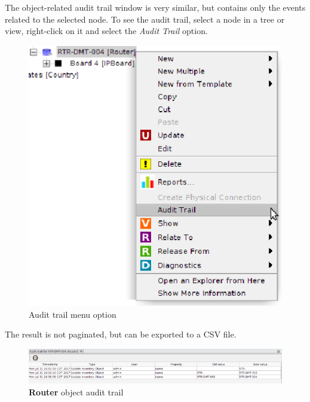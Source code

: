 \documentclass[a4paper]{article}
\begin{document}
	The object-related audit trail window is very similar, but contains only the events related to the selected node. To see the audit trail, select a node in a tree or view, right-click on it and select the \textit{Audit Trail} option.
		\begin{figure}[h!]
			\centering
			\includegraphics[width=0.5\linewidth]{img/audit_trail_menu_option.png}
			\caption{Audit trail menu option}
			\label{fig:audit_trail_menu_option}
		\end{figure}
		\newpage
		The result is not paginated, but can be exported to a CSV file.
		\begin{figure}[h!]
			\centering
			\includegraphics[width=\linewidth]{img/audit_trail_object_related_events.png}
			\caption{\textbf{Router} object audit trail}
			\label{fig:audit_trail_object_related_events}
		\end{figure}
	\clearpage
\end{document}
